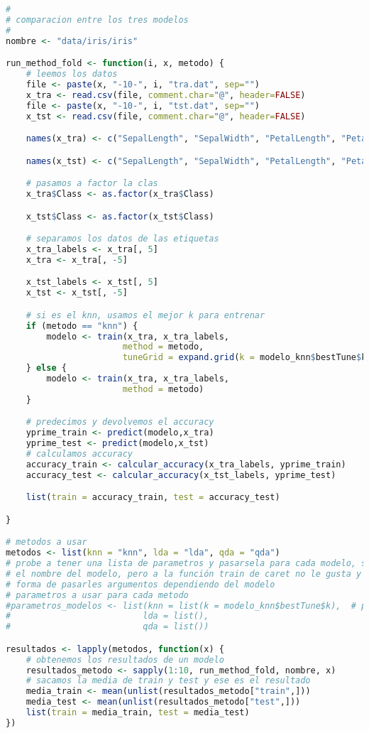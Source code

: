 \begin{lstlisting}[language=R]
#
# comparacion entre los tres modelos
#
nombre <- "data/iris/iris"

run_method_fold <- function(i, x, metodo) {
	# leemos los datos
	file <- paste(x, "-10-", i, "tra.dat", sep="")
	x_tra <- read.csv(file, comment.char="@", header=FALSE)
	file <- paste(x, "-10-", i, "tst.dat", sep="")
	x_tst <- read.csv(file, comment.char="@", header=FALSE)

	names(x_tra) <- c("SepalLength", "SepalWidth", "PetalLength", "PetalWidth", "Class")

	names(x_tst) <- c("SepalLength", "SepalWidth", "PetalLength", "PetalWidth", "Class")

	# pasamos a factor la clas
	x_tra$Class <- as.factor(x_tra$Class)

	x_tst$Class <- as.factor(x_tst$Class)

	# separamos los datos de las etiquetas
	x_tra_labels <- x_tra[, 5]
	x_tra <- x_tra[, -5]

	x_tst_labels <- x_tst[, 5]
	x_tst <- x_tst[, -5]

	# si es el knn, usamos el mejor k para entrenar
	if (metodo == "knn") {
		modelo <- train(x_tra, x_tra_labels,
					   method = metodo,
					   tuneGrid = expand.grid(k = modelo_knn$bestTune$k))
	} else {
		modelo <- train(x_tra, x_tra_labels,
					   method = metodo)
	}

	# predecimos y devolvemos el accuracy
	yprime_train <- predict(modelo,x_tra)
	yprime_test <- predict(modelo,x_tst)
	# calculamos accuracy
	accuracy_train <- calcular_accuracy(x_tra_labels, yprime_train)
	accuracy_test <- calcular_accuracy(x_tst_labels, yprime_test)

	list(train = accuracy_train, test = accuracy_test)

}

# metodos a usar
metodos <- list(knn = "knn", lda = "lda", qda = "qda")
# probe a tener una lista de parametros y pasarsela para cada modelo, sabiendo
# el nombre del modelo, pero a la función train de caret no le gusta y no he encontrado
# forma de pasarles argumentos dependiendo del modelo
# parametros a usar para cada metodo
#parametros_modelos <- list(knn = list(k = modelo_knn$bestTune$k),  # para knn escogemos la mejor k obtenida
#						   lda = list(),
#						   qda = list())

resultados <- lapply(metodos, function(x) {
	# obtenemos los resultados de un modelo
	resultados_metodo <- sapply(1:10, run_method_fold, nombre, x)
	# sacamos la media de train y test y ese es el resultado
	media_train <- mean(unlist(resultados_metodo["train",]))
	media_test <- mean(unlist(resultados_metodo["test",]))
	list(train = media_train, test = media_test)
})


\end{lstlisting}

